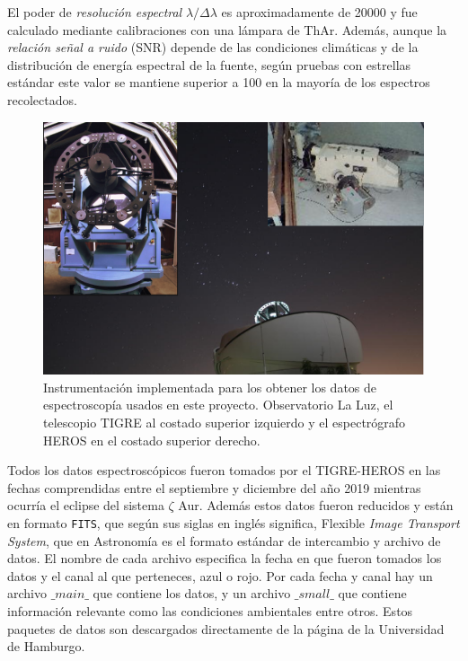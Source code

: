 \documentclass[12pt,oneside,openany,letter]{book}
\begin{document}
\noindent El poder de \textit{resolución espectral} $\lambda / \Delta \lambda$ es aproximadamente de 20000 y fue calculado mediante calibraciones con una lámpara de ThAr. Además, aunque la \textit{relación señal a ruido} (SNR) depende de las condiciones climáticas y de la distribución de energía espectral de la fuente, según pruebas con estrellas estándar este valor se mantiene superior a 100 en la mayoría de los espectros recolectados. 

\begin{figure}
    \centering
    \includegraphics[width=1\linewidth]{Images/TIGRE-HEROS.png}
    \caption[Instrumentación implementada para los obtener los datos de espectroscopía usados en este proyecto]{Instrumentación implementada para los obtener los datos de espectroscopía usados en este proyecto. Observatorio La Luz, el telescopio TIGRE al costado superior izquierdo y el espectrógrafo HEROS en el costado superior derecho.}
    \label{fig:tigre-heros}
\end{figure}


\noindent Todos los datos espectroscópicos fueron tomados por el TIGRE-HEROS en las fechas comprendidas entre el septiembre y diciembre del año 2019 mientras ocurría el eclipse del sistema $\zeta$ Aur. Además estos datos fueron reducidos y están en formato \texttt{FITS}, que según sus siglas en inglés significa, Flexible \textit{Image Transport System}, que en Astronomía es el formato estándar \citep{hanisch2001definition} de intercambio y archivo de datos. El nombre de cada archivo especifica la fecha en que fueron tomados los datos y el canal al que perteneces, azul o rojo. Por cada fecha y canal hay un archivo $\_ main\_$ que contiene los datos, y un archivo $\_ small\_$ que contiene información relevante como las condiciones ambientales entre otros. Estos paquetes de datos son descargados directamente de la página de la Universidad de Hamburgo.
\end{document}
